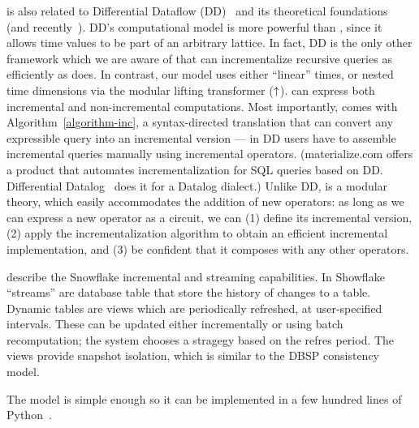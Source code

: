 \dbsp is also related to Differential Dataflow
(DD)~\cite{mcsherry-cidr13,murray-sosp13} and its theoretical
foundations~\cite{abadi-fossacs15} (and
recently~\cite{mcsherry-vldb20,chothia-vldb16}).  DD's computational
model is more powerful than \dbsp, since it allows time values to be
part of an arbitrary lattice.  In fact, DD is the only other framework
which we are aware of that can incrementalize recursive queries as
efficiently as \dbsp does.  In contrast, our model uses either
``linear'' times, or nested time dimensions via the modular lifting
transformer (${\uparrow}$).  \dbsp can express both incremental and
non-incremental computations.  Most importantly, \dbsp comes with
Algorithm~\ref{algorithm-inc}, a syntax-directed translation that can
convert any expressible query into an incremental version --- in DD
users have to assemble incremental queries manually using incremental
operators.  (materialize.com offers a product that automates
incrementalization for SQL queries based on DD.  Differential
Datalog~\cite{ryzhyk-datalog19} does it for a Datalog dialect.)
Unlike DD, \dbsp is a modular theory, which easily accommodates the
addition of new operators: as long as we can express a new operator as
a \dbsp circuit, we can (1) define its incremental version, (2) apply
the incrementalization algorithm to obtain an efficient incremental
implementation, and (3) be confident that it composes with any other
operators.

\cite{akidau-amd23,akidau-debs24} describe the Snowflake incremental
and streaming capabilities.  In Showflake ``streams'' are database
table that store the history of changes to a table.  Dynamic tables
are views which are periodically refreshed, at user-specified
intervals.  These can be updated either incrementally or using batch
recomputation; the system chooses a stragegy based on the refres
period.  The views provide snapshot isolation, which is similar to the
DBSP consistency model.

The \dbsp model is simple enough so it can be implemented in a few
hundred lines of Python~\cite{dbsp-python}.
